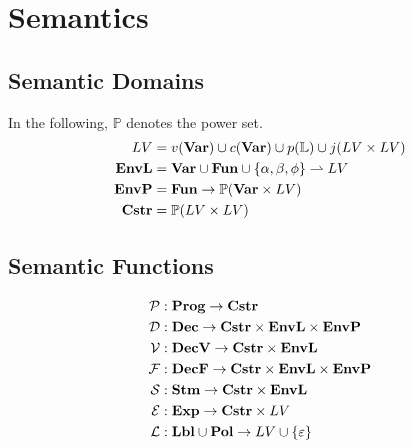 
\newcommand{\iP}{\mathcal{P}}
\newcommand{\iD}{\mathcal{D}}
\newcommand{\iV}{\mathcal{V}}
\newcommand{\iF}{\mathcal{F}}
\newcommand{\iS}{\mathcal{S}}
\newcommand{\iE}{\mathcal{E}}
\newcommand{\iL}{\mathcal{L}}
\newcommand{\iO}{\mathcal{O}}

\newcommand{\iLV}{LV}

\newcommand{\dblSq}[1]{[\![ #1 ]\!]}

\newcommand{\rspace}{\\[1em]}
\newcommand{\dsWhere}[1]{\quad \text{ where } #1}
\newcommand{\dsAnd}[1]{\quad \text{ and } #1}
\newcommand{\dsIf}[1]{\quad \text{ if } #1}

\section{Semantics}

\subsection{Semantic Domains}
In the following, $\mathbb P$ denotes the power set.
\begin{align*}
\iLV      & = v(\iVar) \cup c(\iVar) \cup p(\mathbb{L}) \cup j(\iLV \times \iLV) \\
\iEnvL  & = \iVar \cup \iFun \cup \{ \ia, \ib, \ifb \} \rightharpoonup \iLV \\
\iEnvP  & = \iFun \rightarrow \mathbb P (\iVar \times \iLV) \\
\iCstr  & = \mathbb P (\iLV \times \iLV)
\end{align*}

\subsection{Semantic Functions}
\begin{align*}
\iP & : \iProg \rightarrow \iCstr \\
\iD & : \iDec \rightarrow \iCstr \times \iEnvL \times \iEnvP \\
\iV & : \iDecv \rightarrow \iCstr \times \iEnvL \\
\iF & : \iDecf \rightarrow \iCstr \times \iEnvL \times \iEnvP \\
\iS & : \iStm \rightarrow \iCstr \times \iEnvL \\
\iE & : \iExp \rightarrow \iCstr \times \iLV \\
\iL & : \iLbl \cup \iPol \rightarrow \iLV \cup \{ \varepsilon \}
\end{align*}

